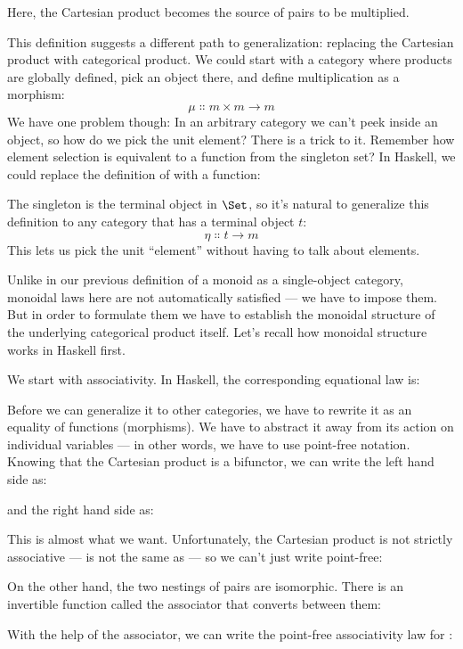 Here, the Cartesian product  becomes the source of pairs
to be multiplied.

This definition suggests a different path to generalization: replacing
the Cartesian product with categorical product. We could start with a
category where products are globally defined, pick an object 
there, and define multiplication as a morphism:
\[\mu \Colon m\times{}m \to m\]
We have one problem though: In an arbitrary category we can't peek
inside an object, so how do we pick the unit element? There is a trick
to it. Remember how element selection is equivalent to a function from
the singleton set? In Haskell, we could replace the definition of
 with a function:

The singleton is the terminal object in $\Set$, so it's natural to
generalize this definition to any category that has a terminal object
$t$:
\[\eta \Colon t \to m\]
This lets us pick the unit ``element'' without having to talk about
elements.

Unlike in our previous definition of a monoid as a single-object
category, monoidal laws here are not automatically satisfied --- we have
to impose them. But in order to formulate them we have to establish the
monoidal structure of the underlying categorical product itself. Let's
recall how monoidal structure works in Haskell first.

We start with associativity. In Haskell, the corresponding equational
law is:

Before we can generalize it to other categories, we have to rewrite it
as an equality of functions (morphisms). We have to abstract it away
from its action on individual variables --- in other words, we have to
use point-free notation. Knowing that the Cartesian product is a
bifunctor, we can write the left hand side as:

and the right hand side as:

This is almost what we want. Unfortunately, the Cartesian product is not
strictly associative ---  is not the same as
 --- so we can't just write point-free:

On the other hand, the two nestings of pairs are isomorphic. There is an
invertible function called the associator that converts between them:

With the help of the associator, we can write the point-free
associativity law for :

